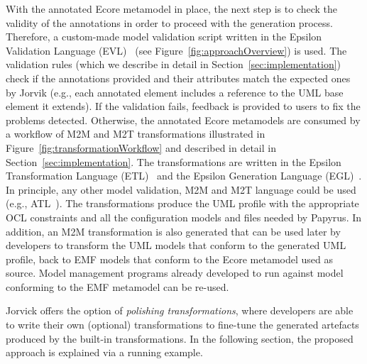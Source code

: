 With the annotated Ecore metamodel in place, the next step is to check the validity of the annotations in order to proceed with the generation process. 
Therefore, a custom-made model validation script written in the Epsilon Validation Language (EVL)~\cite{evlKolovos} (see Figure~\ref{fig:approachOverview}) is used.
The validation rules (which we describe in detail in Section~\ref{sec:implementation}) check if the annotations provided and their attributes match the expected ones by Jorvik (e.g., each annotated element includes a reference to the UML base element it extends). 
If the validation fails, feedback is provided to users to fix the problems detected. 
Otherwise, the annotated Ecore metamodels are consumed by a workflow of M2M and M2T  transformations illustrated in Figure~\ref{fig:transformationWorkflow} and described in detail in Section~\ref{sec:implementation}. 
The transformations are written in the Epsilon Transformation Language (ETL)~\cite{Kolovos2008} and the Epsilon Generation Language (EGL)~\cite{rose2008egl}. 
In principle, any other model validation, M2M and M2T language could be used (e.g., ATL~\cite{jouault2006atl}). 
The transformations produce the UML profile with the appropriate OCL constraints and all the configuration models and files needed by Papyrus. 
In addition, an M2M transformation is also generated that can be used later by developers to transform the UML models that conform to the generated UML profile, back to EMF models that conform to the Ecore metamodel used as source. 
Model management programs already developed to run against model conforming to the EMF metamodel can be re-used.

Jorvick offers the option of \textit{polishing transformations}, where developers are able to write their own (optional) transformations to fine-tune the generated artefacts produced by the built-in transformations. 
In the following section, the proposed approach is explained via a running example.


\begin{figure}[ht!]
	
	\vspace*{-5mm}
\end{figure}
